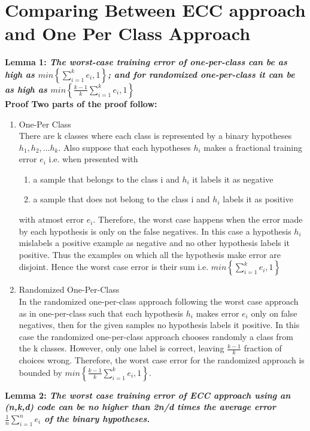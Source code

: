 \documentclass[11pt]{article}
\begin{document}
\section{Comparing Between ECC approach and One Per Class Approach}
    \bf Lemma 1: \normalfont \textit{ The worst-case training error of one-per-class can be as high as $min\left\{\sum_{i=1}^k e_i , 1\right\}$; and for randomized one-per-class it can be as high as $min\left\{\frac{k-1}{k}\sum_{i=1}^k e_i,1\right\}$}\\
    \bf Proof \normalfont Two parts of the proof follow:
    \begin{enumerate}
        \item One-Per Class\\
        There are k classes where each class is represented by a binary hypotheses $h_1,h_2,...h_k$. Also suppose that each hypotheses $h_i$ makes a fractional training error $e_i$ i.e. when presented with 
        \begin{enumerate}
            \item a sample that belongs to the class i and $h_i$ it labels it as negative
            \item a sample that does not belong to the class i and $h_i$ labels it as positive
        \end{enumerate}
        with atmost error $e_i$. Therefore, the worst case happens when the error made by each hypothesis is only on the false negatives. In this case a hypothesis $h_i$ mislabels a positive example as negative and no other hypothesis labels it positive. Thus the examples on which all the hypothesis make error are disjoint. Hence the worst case error is their sum i.e. $min\left\{\sum_{i=1}^k e_i , 1\right\}$ 
        
        \item Randomized One-Per-Class\\
        In the randomized one-per-class approach following the worst case approach as in one-per-class such that each hypothesis $h_i$ makes error $e_i$ only on false negatives, then for the given samples no hypothesis labels it positive. In this case the randomized one-per-class approach chooses randomly a class from the k classes. However, only one label is correct, leaving $\frac{k-1}{k}$ fraction of choices wrong. Therefore, the worst case error for the randomized approach is bounded by $min\left\{\frac{k-1}{k}\sum_{i=1}^k e_i,1\right\}$.
    \end{enumerate} 
    \bf Lemma 2: \normalfont \textit{The worst case training error of ECC approach using an (n,k,d) code can be no higher than 2n/d times the average error $\frac{1}{n}\sum_{i=1}^n e_i$ of the binary hypotheses.}\\
\end{document}

